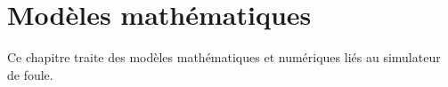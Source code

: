 \chapter{Modèles mathématiques}
%
Ce chapitre traite des modèles mathématiques et numériques liés au simulateur de foule.
%


%
